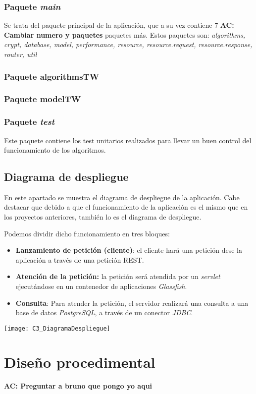 \subsubsection{Paquete \textit{main}}
Se trata del paquete principal de la aplicación, que a su vez contiene 7 \textbf{AC: Cambiar numero y paquetes} paquetes más.
Estos paquetes son: \textit{algorithms, crypt, database, model, performance, resource, resource.request, resource.response, router, util}

\subsubsection{Paquete algorithmsTW}

\subsubsection{Paquete modelTW}

\subsubsection{Paquete \textit{test}}
Este paquete contiene los test unitarios realizados para llevar un buen control del funcionamiento de los algoritmos.
\subsection{Diagrama de despliegue}
En este apartado se muestra el diagrama de despliegue de la aplicación.
Cabe destacar que debido a que el funcionamiento de la aplicación es el mismo que en los proyectos anteriores, también lo es el diagrama de despliegue.

Podemos dividir dicho funcionamiento en tres bloques:
\begin{itemize}
\item \textbf{Lanzamiento de petición (cliente)}: el cliente hará una petición dese la aplicación a través de una petición REST.
\item \textbf{Atención de la petición:} la petición será atendida por un \textit{servlet} ejecutándose en un contenedor de aplicaciones \textit{Glassfish}.
\item \textbf{Consulta}: Para atender la petición, el servidor realizará una consulta a una base de datos \textit{PostgreSQL}, a través de un conector \textit{JDBC}.
\end{itemize}
\texttt{[image: C3\_DiagramaDespliegue]}
\section{Diseño procedimental}
\textbf{AC: Preguntar a bruno que pongo yo aqui}
